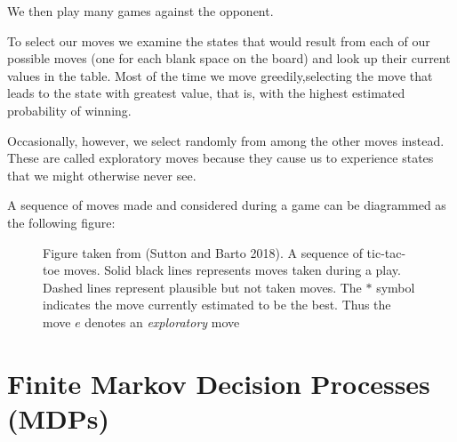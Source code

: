 \documentclass[
  letterpaper,
  DIV=11,
  numbers=noendperiod]{scrreprt}
\theoremstyle{definition}
\theoremstyle{remark}
\begin{document}
We then play many games against the opponent.

To select our moves we examine the states that would result from each of
our possible moves (one for each blank space on the board) and look up
their current values in the table. Most of the time we move
greedily,selecting the move that leads to the state with greatest value,
that is, with the highest estimated probability of winning.

Occasionally, however, we select randomly from among the other moves
instead. These are called exploratory moves because they cause us to
experience states that we might otherwise never see.

A sequence of moves made and considered during a game can be diagrammed
as the following figure:

\begin{figure}


\caption{\label{fig-tic_tac_toc_diag}Figure taken from (Sutton and Barto
2018). A sequence of tic-tac-toe moves. Solid black lines represents
moves taken during a play. Dashed lines represent plausible but not
taken moves. The \(*\) symbol indicates the move currently estimated to
be the best. Thus the move \(e\) denotes an \emph{exploratory} move}

\end{figure}%


\chapter{Finite Markov Decision Processes
(MDPs)}\label{finite-markov-decision-processes-mdps}
\end{document}
